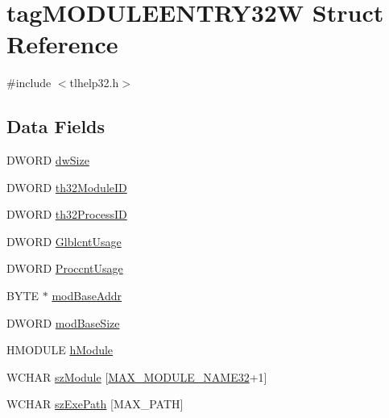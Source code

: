 \hypertarget{structtag_m_o_d_u_l_e_e_n_t_r_y32_w}{}\section{tag\+M\+O\+D\+U\+L\+E\+E\+N\+T\+R\+Y32W Struct Reference}
\label{structtag_m_o_d_u_l_e_e_n_t_r_y32_w}


{\ttfamily \#include $<$tlhelp32.\+h$>$}

\subsection*{Data Fields}
\begin{DoxyCompactItemize}
\item 
D\+W\+O\+RD \hyperlink{structtag_m_o_d_u_l_e_e_n_t_r_y32_w_a669c5a85f5a9eb97e64ad880fadaaa2d}{dw\+Size}
\item 
D\+W\+O\+RD \hyperlink{structtag_m_o_d_u_l_e_e_n_t_r_y32_w_ac028c0e590bc5c6303111ccf82c25517}{th32\+Module\+ID}
\item 
D\+W\+O\+RD \hyperlink{structtag_m_o_d_u_l_e_e_n_t_r_y32_w_a4e94a85eb6671f7346bc1fb284f56186}{th32\+Process\+ID}
\item 
D\+W\+O\+RD \hyperlink{structtag_m_o_d_u_l_e_e_n_t_r_y32_w_af5e285e8235ab5a34fae45f3b275d54e}{Glblcnt\+Usage}
\item 
D\+W\+O\+RD \hyperlink{structtag_m_o_d_u_l_e_e_n_t_r_y32_w_acf40e3931fdf7679a6618f584cd4686a}{Proccnt\+Usage}
\item 
B\+Y\+TE $\ast$ \hyperlink{structtag_m_o_d_u_l_e_e_n_t_r_y32_w_af69cbbeda18be4584784e7e289cc4dc1}{mod\+Base\+Addr}
\item 
D\+W\+O\+RD \hyperlink{structtag_m_o_d_u_l_e_e_n_t_r_y32_w_a98886f2c939d29359f700bea645b9cf6}{mod\+Base\+Size}
\item 
H\+M\+O\+D\+U\+LE \hyperlink{structtag_m_o_d_u_l_e_e_n_t_r_y32_w_ae3642ec58b041930c54b501841cc736d}{h\+Module}
\item 
W\+C\+H\+AR \hyperlink{structtag_m_o_d_u_l_e_e_n_t_r_y32_w_aa0df979e7e2752d691cf2f481e293741}{sz\+Module} \mbox{[}\hyperlink{tlhelp32_8h_af49cb1543478a8a476fdff338f27e478}{M\+A\+X\+\_\+\+M\+O\+D\+U\+L\+E\+\_\+\+N\+A\+M\+E32}+1\mbox{]}
\item 
W\+C\+H\+AR \hyperlink{structtag_m_o_d_u_l_e_e_n_t_r_y32_w_ac8404fb1b0e1abfc9350bcb72318c12b}{sz\+Exe\+Path} \mbox{[}M\+A\+X\+\_\+\+P\+A\+TH\mbox{]}
\end{DoxyCompactItemize}


